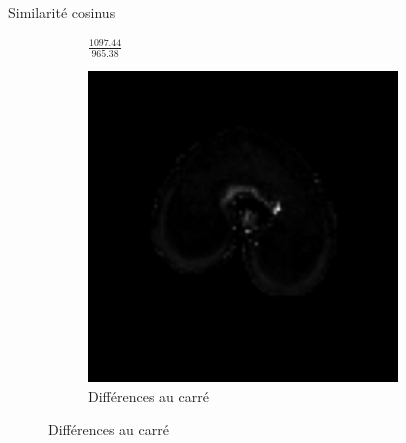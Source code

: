 \documentclass[10pt]{beamer}
\begin{document}
\begin{frame}{Similarité cosinus}
{\begin{figure}[ht]
\begin{subfigure}[t]{0.33\textwidth}
        \caption{$\frac{1097.44}{965.38}$}
        \label{subfig:cosine_msi}
      \end{subfigure}%
      \begin{subfigure}[t]{0.33\textwidth}
        \centering
        \includegraphics[width=0.9\textwidth]{fig/cosine_diff}%
        \caption{Différences au carré}
      \end{subfigure}%
    \end{figure}
  }
  

\end{frame}
\end{document}
